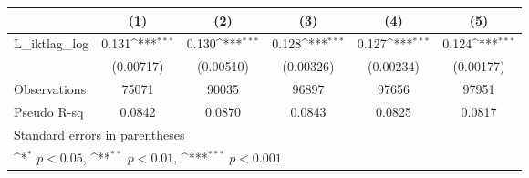 {
\def\sym#1{\ifmmode^{#1}\else\(^{#1}\)\fi}
\begin{tabular}{l*{5}{c}}
\hline\hline
                &\multicolumn{1}{c}{(1)}         &\multicolumn{1}{c}{(2)}         &\multicolumn{1}{c}{(3)}         &\multicolumn{1}{c}{(4)}         &\multicolumn{1}{c}{(5)}         \\
\hline
L\_iktlag\_log    &    0.131\sym{***}&    0.130\sym{***}&    0.128\sym{***}&    0.127\sym{***}&    0.124\sym{***}\\
                &(0.00717)         &(0.00510)         &(0.00326)         &(0.00234)         &(0.00177)         \\
\hline
Observations    &    75071         &    90035         &    96897         &    97656         &    97951         \\
Pseudo R-sq     &   0.0842         &   0.0870         &   0.0843         &   0.0825         &   0.0817         \\
\hline\hline
\multicolumn{6}{l}{\footnotesize Standard errors in parentheses}\\
\multicolumn{6}{l}{\footnotesize \sym{*} \(p<0.05\), \sym{**} \(p<0.01\), \sym{***} \(p<0.001\)}\\
\end{tabular}
}

